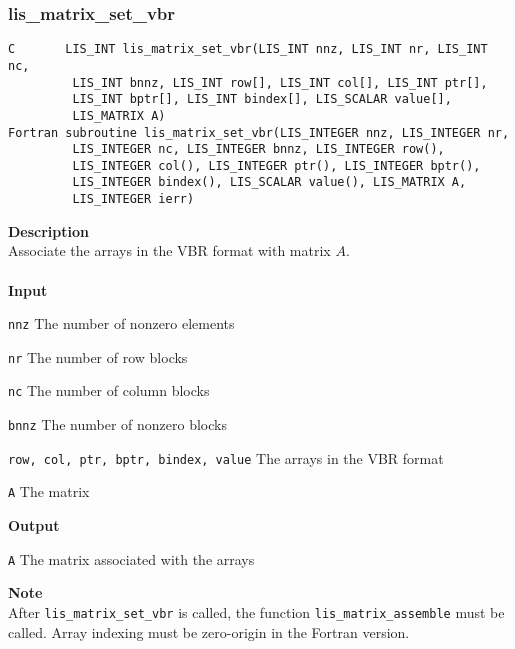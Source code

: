 \documentclass[a4paper]{article}
\newcommand{\namelistlabel}[1]{\mbox{#1}\hfill}
\newenvironment{namelist}[1]{%
\begin{list}{}
  {\let\makelabel\namelistlabel
  \settowidth{\labelwidth}{#1}
  \setlength{\leftmargin}{1.1\labelwidth}}
  }{%
\end{list}}
\begin{document}
\subsubsection{lis\_matrix\_set\_vbr}
\begin{screen}
\verb|C       LIS_INT lis_matrix_set_vbr(LIS_INT nnz, LIS_INT nr, LIS_INT nc,|\\
\verb|         LIS_INT bnnz, LIS_INT row[], LIS_INT col[], LIS_INT ptr[],|\\
\verb|         LIS_INT bptr[], LIS_INT bindex[], LIS_SCALAR value[],|\\
\verb|         LIS_MATRIX A)|\\
\verb|Fortran subroutine lis_matrix_set_vbr(LIS_INTEGER nnz, LIS_INTEGER nr,|\\
\verb|         LIS_INTEGER nc, LIS_INTEGER bnnz, LIS_INTEGER row(),|\\
\verb|         LIS_INTEGER col(), LIS_INTEGER ptr(), LIS_INTEGER bptr(),|\\
\verb|         LIS_INTEGER bindex(), LIS_SCALAR value(), LIS_MATRIX A,|\\
\verb|         LIS_INTEGER ierr) |
\end{screen}
{\bf Description}\\
\indent
Associate the arrays in the VBR format with matrix $A$.
\\ \\
\noindent
{\bf Input}
\begin{namelist}{XXXXXXXXXXXXXXXXXXXX}
\item[\tt nnz] The number of nonzero elements
\item[\tt nr] The number of row blocks
\item[\tt nc] The number of column blocks
\item[\tt bnnz] The number of nonzero blocks
\item[\tt row, col, ptr, bptr, bindex, value] The arrays in the VBR format
\item[\tt A] The matrix
\end{namelist}
{\bf Output}
\begin{namelist}{XXXXXXXXXXXXXXXXXXXX}
\item[\tt A] The matrix associated with the arrays
\end{namelist}
\noindent
{\bf Note}\\
\indent
After \verb|lis_matrix_set_vbr| is called, 
the function \verb|lis_matrix_assemble| must be called. 
Array indexing must be zero-origin in the Fortran version.
\end{document}
